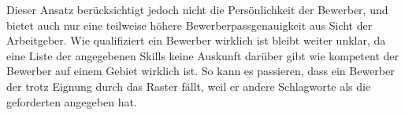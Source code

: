Dieser Ansatz berücksichtigt jedoch nicht die Persönlichkeit der Bewerber, und bietet auch nur eine teilweise höhere Bewerberpassgenauigkeit aus Sicht der Arbeitgeber. Wie qualifiziert ein Bewerber wirklich ist bleibt weiter unklar, da eine Liste der angegebenen Skills keine Auskunft darüber gibt wie kompetent der Bewerber auf einem Gebiet wirklich ist. So kann es passieren, dass ein Bewerber der trotz Eignung durch das Raster fällt, weil er andere Schlagworte als die geforderten angegeben hat.





